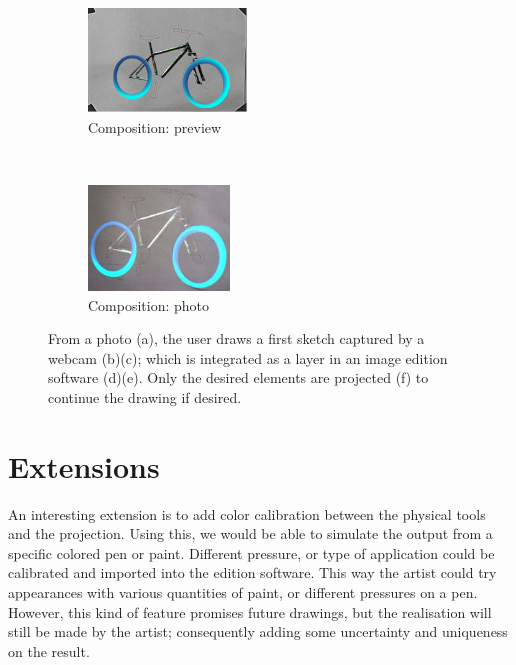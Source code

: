 \documentclass{article}
\begin{document}
\begin{figure}[!htb]
\begin{subfigure}[b]{0.20\textwidth}
                \label{fig:gimp1}
        \end{subfigure}
        \\
        \begin{subfigure}[b]{0.20\textwidth}
                \centering
                \includegraphics[height= 2.8cm]{mix2}
                \caption{Composition: preview}
                \label{fig:gimp2}
        \end{subfigure}
        ~ \hspace{4mm}
        \begin{subfigure}[b]{0.20\textwidth}
                \centering
                \includegraphics[height= 2.8cm]{velo2}
                \caption{Composition: photo}
                \label{fig:proj}
        \end{subfigure}
        \caption{From a photo (a), the user draws a first sketch captured by a webcam (b)(c); which is integrated as a layer in an image edition software (d)(e). Only the desired elements are projected (f) to continue the drawing if desired.}\label{fig:velo6illu}
\end{figure}


\section{Extensions}

An interesting extension is to add color calibration between the physical tools and the projection. Using this, we would be able to simulate the output from a specific colored pen or paint. Different pressure, or type of application could be calibrated and imported into the edition software. This way the artist could try appearances with various quantities of paint, or different pressures on a pen. However, this kind of feature promises future drawings, but the realisation will still be made by the artist; consequently adding some uncertainty and uniqueness on the result. 
\end{document}
